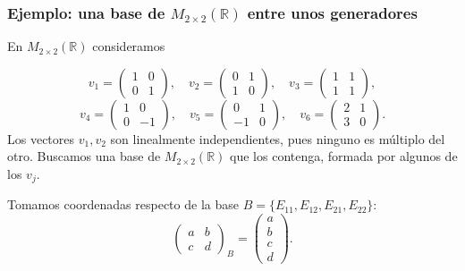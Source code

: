 \begin{frame}
    \frametitle{Ejemplo: una base de \(M_{2\times2}(\mathbb{R})\) entre unos generadores}

    \begin{example}
        En \(M_{2\times2}(\mathbb{R})\) consideramos

        \vspace{-3pt}

        \[
            v_1=\begin{pmatrix}1&0\\0&1\end{pmatrix},\quad
            v_2=\begin{pmatrix}0&1\\1&0\end{pmatrix},\quad
            v_3=\begin{pmatrix}1&1\\1&1\end{pmatrix},
        \]
        \[
            v_4=\begin{pmatrix}1&0\\0&-1\end{pmatrix},\quad
            v_5=\begin{pmatrix}0&1\\-1&0\end{pmatrix},\quad
            v_6=\begin{pmatrix}2&1\\3&0\end{pmatrix}.
        \]
        Los vectores \(v_1,v_2\) son linealmente independientes, pues
        ninguno es múltiplo del otro. Buscamos una base de
        \(M_{2\times2}(\mathbb{R})\) que los contenga, formada por algunos
        de los \(v_j\).

        Tomamos coordenadas respecto de la base
        \(B=\{E_{11},E_{12},E_{21},E_{22}\}\):
        \[
            \begin{pmatrix}a&b\\c&d\end{pmatrix}_B=\begin{pmatrix}a\\b\\c\\d\end{pmatrix}.
        \]
    \end{example}
\end{frame}


